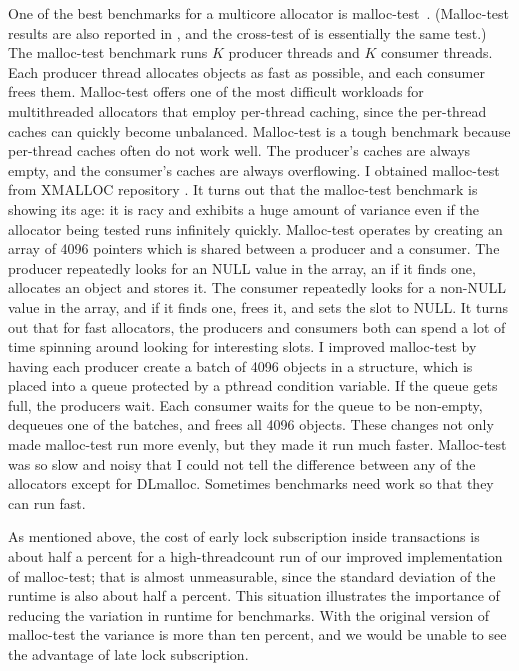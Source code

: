 \documentclass[natbib,sort&compress,10pt]{sigplanconf}
\begin{document}
One of the best benchmarks for a multicore allocator is
malloc-test~\cite{LeverBo00}.  (Malloc-test results are also reported
in \cite{Evans06}, and the cross-test of \cite{KukanovVo07} is
essentially the same test.)  The malloc-test benchmark runs $K$
producer threads and $K$ consumer threads.  Each producer thread
allocates objects as fast as possible, and each consumer frees them.
Malloc-test offers one of the most difficult workloads for
multithreaded allocators that employ per-thread caching, since the
per-thread caches can quickly become unbalanced.  Malloc-test is a
tough benchmark because per-thread caches often do not work well.  The
producer's caches are always empty, and the consumer's caches are
always overflowing.  I obtained malloc-test from XMALLOC repository
\cite{EderSc12}.  It turns out that the malloc-test benchmark is
showing its age: it is racy and exhibits a huge amount of variance
even if the allocator being tested runs infinitely quickly.
Malloc-test operates by creating an array of 4096 pointers which is
shared between a producer and a consumer.  The producer repeatedly
looks for an NULL value in the array, an if it finds one, allocates an
object and stores it.  The consumer repeatedly looks for a non-NULL
value in the array, and if it finds one, frees it, and sets the slot
to NULL\@.  It turns out that for fast allocators, the producers and
consumers both can spend a lot of time spinning around looking for
interesting slots.  I improved malloc-test by having each producer
create a batch of 4096 objects in a structure, which is placed into a
queue protected by a pthread condition variable.  If the queue gets
full, the producers wait.  Each consumer waits for the queue to be
non-empty, dequeues one of the batches, and frees all 4096 objects.
These changes not only made malloc-test run more evenly, but they made
it run much faster.  Malloc-test was so slow and noisy that I could
not tell the difference between any of the allocators except for
DLmalloc.  Sometimes benchmarks need work so that they can run fast.

As mentioned above, the cost of early lock subscription inside
transactions is about half a percent for a high-threadcount run of our
improved implementation of malloc-test; that is almost unmeasurable,
since the standard deviation of the runtime is also about half a
percent.  This situation illustrates the importance of reducing the
variation in runtime for benchmarks.  With the original version of
malloc-test the variance is more than ten percent, and we would be
unable to see the advantage of late lock subscription.
\end{document}
